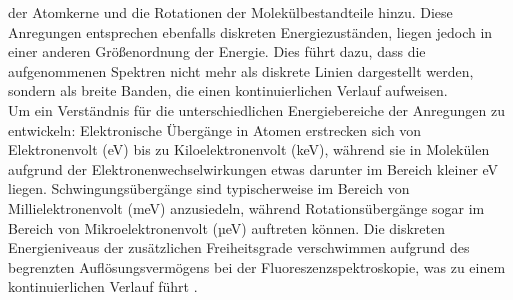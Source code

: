 der Atomkerne und die Rotationen der Molekülbestandteile hinzu. 
Diese Anregungen entsprechen ebenfalls diskreten Energiezuständen, liegen 
jedoch in einer anderen Größenordnung der Energie. 
Dies führt dazu, dass die aufgenommenen Spektren nicht mehr als diskrete Linien 
dargestellt werden, sondern als breite Banden, die einen kontinuierlichen Verlauf aufweisen. \\ 
Um ein Verständnis für die unterschiedlichen Energiebereiche der Anregungen zu entwickeln: 
Elektronische Übergänge in Atomen erstrecken sich von Elektronenvolt (eV) bis zu 
Kiloelektronenvolt (keV), während sie in Molekülen aufgrund der Elektronenwechselwirkungen 
etwas darunter im Bereich kleiner eV liegen. 
Schwingungsübergänge sind typischerweise im Bereich von Millielektronenvolt (meV) anzusiedeln, 
während Rotationsübergänge sogar im Bereich von Mikroelektronenvolt (µeV) auftreten können. 
Die diskreten Energieniveaus der zusätzlichen Freiheitsgrade verschwimmen 
aufgrund des begrenzten Auflösungsvermögens bei der Fluoreszenzspektroskopie, 
was zu einem kontinuierlichen Verlauf führt \cite{EPC, Prinzip, Parson, AMO}. \\
